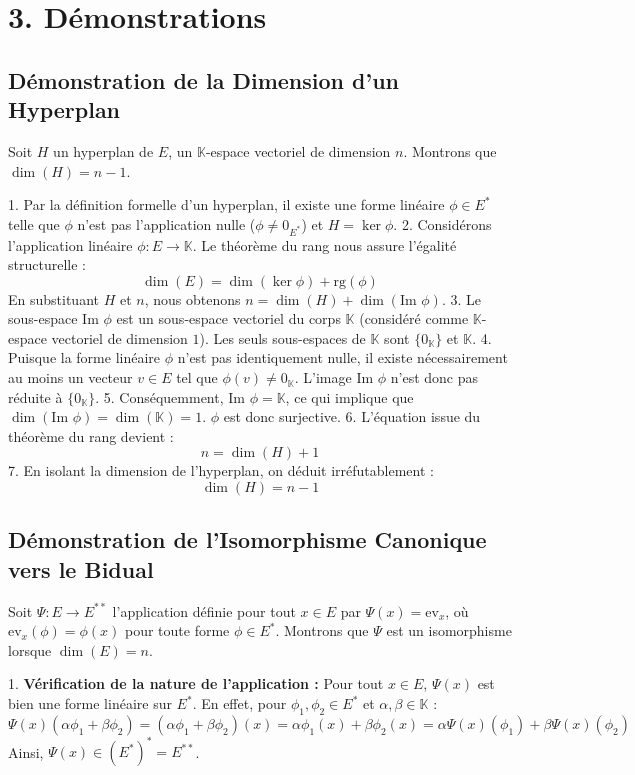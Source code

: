 \documentclass[11pt,a4paper]{report}
\begin{document}
\section{3. Démonstrations}

\subsection{Démonstration de la Dimension d'un Hyperplan}

Soit $H$ un hyperplan de $E$, un $\mathbb{K}$-espace vectoriel de dimension $n$. Montrons que $\dim(H) = n - 1$.

1. Par la définition formelle d'un hyperplan, il existe une forme linéaire $\phi \in E^*$ telle que $\phi$ n'est pas l'application nulle ($\phi \neq 0_{E^*}$) et $H = \ker \phi$.
2. Considérons l'application linéaire $\phi : E \to \mathbb{K}$. Le théorème du rang nous assure l'égalité structurelle :
   $$\dim(E) = \dim(\ker \phi) + \text{rg}(\phi)$$
   En substituant $H$ et $n$, nous obtenons $n = \dim(H) + \dim(\text{Im }\phi)$.
3. Le sous-espace $\text{Im }\phi$ est un sous-espace vectoriel du corps $\mathbb{K}$ (considéré comme $\mathbb{K}$-espace vectoriel de dimension $1$). Les seuls sous-espaces de $\mathbb{K}$ sont $\{0_\mathbb{K}\}$ et $\mathbb{K}$.
4. Puisque la forme linéaire $\phi$ n'est pas identiquement nulle, il existe nécessairement au moins un vecteur $v \in E$ tel que $\phi(v) \neq 0_\mathbb{K}$. L'image $\text{Im }\phi$ n'est donc pas réduite à $\{0_\mathbb{K}\}$.
5. Conséquemment, $\text{Im }\phi = \mathbb{K}$, ce qui implique que $\dim(\text{Im }\phi) = \dim(\mathbb{K}) = 1$. $\phi$ est donc surjective.
6. L'équation issue du théorème du rang devient :
   $$n = \dim(H) + 1$$
7. En isolant la dimension de l'hyperplan, on déduit irréfutablement :
   $$\dim(H) = n - 1$$

\subsection{Démonstration de l'Isomorphisme Canonique vers le Bidual}

Soit $\Psi : E \to E^{**}$ l'application définie pour tout $x \in E$ par $\Psi(x) = \text{ev}_x$, où $\text{ev}_x(\phi) = \phi(x)$ pour toute forme $\phi \in E^*$. Montrons que $\Psi$ est un isomorphisme lorsque $\dim(E) = n$.

1. \textbf{Vérification de la nature de l'application :}
   Pour tout $x \in E$, $\Psi(x)$ est bien une forme linéaire sur $E^*$. En effet, pour $\phi_1, \phi_2 \in E^*$ et $\alpha, \beta \in \mathbb{K}$ :
   $$\Psi(x)(\alpha \phi_1 + \beta \phi_2) = (\alpha \phi_1 + \beta \phi_2)(x) = \alpha \phi_1(x) + \beta \phi_2(x) = \alpha \Psi(x)(\phi_1) + \beta \Psi(x)(\phi_2)$$
   Ainsi, $\Psi(x) \in (E^*)^* = E^{**}$.
\end{document}

